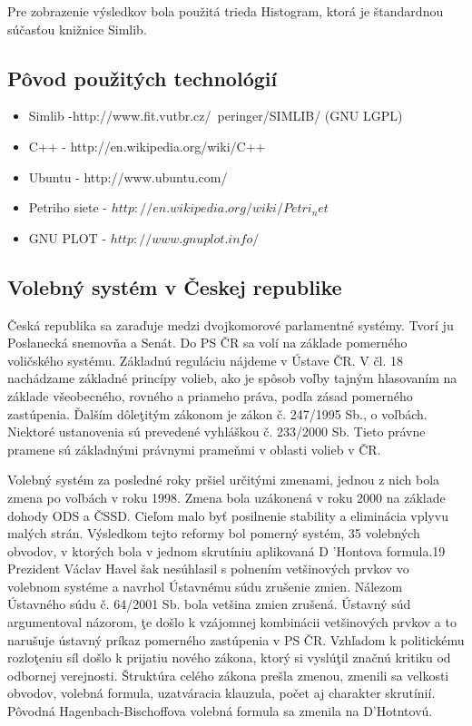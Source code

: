 \documentclass[12pt,a4paper,titlepage,final]{article}
\begin{document}
Pre zobrazenie výsledkov bola použitá trieda Histogram, ktorá je štandardnou súčasťou knižnice Simlib.

\subsection{Pôvod použitých technológií}
\begin{itemize}
\item Simlib -http://www.fit.vutbr.cz/~peringer/SIMLIB/ (GNU LGPL)
\item C++ - http://en.wikipedia.org/wiki/C++
\item Ubuntu - http://www.ubuntu.com/
\item Petriho siete - $http://en.wikipedia.org/wiki/Petri_net$
\item GNU PLOT - $http://www.gnuplot.info/$

\end{itemize}
\subsection{Volebný systém v Českej republike}
Česká republika sa zaraďuje medzi dvojkomorové parlamentné 
systémy. Tvorí ju Poslanecká snemovňa a Senát. Do PS ČR sa volí na 
základe pomerného voličského systému. Základnú reguláciu nájdeme 
v Ústave ČR. V čl. 18 nachádzame základné princípy volieb, ako je spôsob 
voľby tajným hlasovaním na základe všeobecného, rovného a priameho 
práva, podľa zásad pomerného zastúpenia. Ďalším dôleţitým zákonom je 
zákon č. 247/1995 Sb., o voľbách. Niektoré ustanovenia sú prevedené 
vyhláškou č. 233/2000 Sb. Tieto právne pramene sú základnými právnymi 
prameňmi v oblasti volieb v ČR. 
 
Volebný systém za posledné roky pršiel určitými zmenami, jednou 
z nich bola zmena po voľbách v roku 1998. Zmena bola uzákonená v roku 
2000 na základe dohody ODS a ČSSD. Cieľom malo byť posilnenie 
stability a eliminácia vplyvu malých strán. Výsledkom tejto reformy bol 
pomerný systém, 35 volebných obvodov, v ktorých bola v jednom skrutíniu 
aplikovaná D 'Hontova formula.19
 Prezident Václav Havel šak nesúhlasil 
s polnením vetšinových prvkov vo volebnom systéme a navrhol Ústavnému 
súdu zrušenie zmien. Nálezom Ústavného súdu č. 64/2001 Sb. bola vetšina 
zmien zrušená. Ústavný súd argumentoval názorom, ţe došlo k vzájomnej 
kombinácii vetšinových prvkov a to narušuje ústavný príkaz pomerného 
zastúpenia v PS ČR. Vzhľadom k politickému rozloţeniu síl došlo k prijatiu 
nového zákona, ktorý si vyslúţil značnú kritiku od odbornej verejnosti. 
Štruktúra celého zákona prešla zmenou, zmenili sa velkosti obvodov, 
volebná formula, uzatváracia klauzula, počet aj charakter skrutínií. Pôvodná 
Hagenbach-Bischoffova volebná formula sa zmenila na D'Hotntovú. 
 
\end{document}
